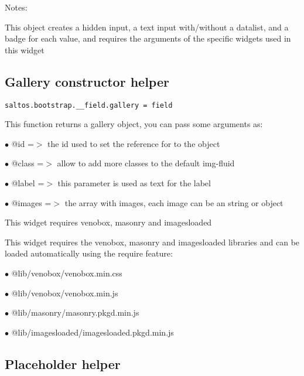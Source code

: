 \documentclass[a4paper]{book}
\begin{document}
Notes:

This object creates a hidden input, a text input with/without a datalist, and a badge for
each value, and requires the arguments of the specific widgets used in this widget

\hypertarget{toc464}{}
\subsection{Gallery constructor helper}

\begin{lstlisting}
saltos.bootstrap.__field.gallery = field
\end{lstlisting}

This function returns a gallery object, you can pass some arguments as:

\begin{compactitem}
\item[\color{myblue}$\bullet$] @id     =$>$ the id used to set the reference for to the object
\item[\color{myblue}$\bullet$] @class  =$>$ allow to add more classes to the default img-fluid
\item[\color{myblue}$\bullet$] @label  =$>$ this parameter is used as text for the label
\item[\color{myblue}$\bullet$] @images =$>$ the array with images, each image can be an string or object
\end{compactitem}

This widget requires venobox, masonry and imagesloaded

This widget requires the venobox, masonry and imagesloaded libraries and can be loaded
automatically using the require feature:

\begin{compactitem}
\item[\color{myblue}$\bullet$] @lib/venobox/venobox.min.css
\item[\color{myblue}$\bullet$] @lib/venobox/venobox.min.js
\item[\color{myblue}$\bullet$] @lib/masonry/masonry.pkgd.min.js
\item[\color{myblue}$\bullet$] @lib/imagesloaded/imagesloaded.pkgd.min.js
\end{compactitem}

\hypertarget{toc465}{}
\subsection{Placeholder helper}
\end{document}
